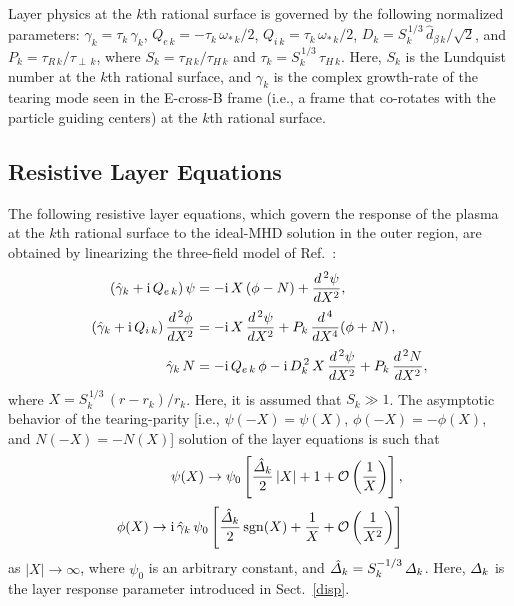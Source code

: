\documentclass[12pt,prb,aps]{revtex4-1}
\begin{document}
Layer physics at the $k$th rational surface is governed by the following normalized parameters:
$\hat{\gamma}_k= \tau_k\,\gamma_k$, 
$Q_{e\,k }= - \tau_k\,\omega_{\ast\,k}/2$, 
$Q_{i\,k }=  \tau_k\,\omega_{\ast\,k}/2$, 
$D_k = S_{k}^{\,1/3}\,\hat{d}_{\beta\,k}/\sqrt{2}$, 
and $P_{k} = \tau_{R\,k}/\tau_{\perp\,k}$, 
where $S_k = \tau_{R\,k}/\tau_{H\,k}$ and 
$\tau_k = S_k^{\,1/3} \,\tau_{H\,k}$.   Here, $S_k$ is the Lundquist number at the $k$th rational surface, and $\gamma_k$ is the complex growth-rate of the tearing mode seen in the E-cross-B frame (i.e., a frame that co-rotates with the
particle guiding centers) at the $k$th rational surface.

\subsection{Resistive Layer Equations}\label{rlayer}
The following resistive layer equations, which govern the response of the plasma at the $k$th rational surface to the ideal-MHD solution in the outer region,  are obtained by linearizing the three-field model of Ref.~:
\begin{align}\label{e80y}
(\hat{\gamma}_k+{\rm i}\,Q_{e\,k})\,\psi&= - {\rm i}\,X\left(\phi-N\right) + \frac{d^{\,2}\psi}{d X^2},\\[0.5ex]
(\hat{\gamma}_k+{\rm i}\,Q_{i\,k})\,\frac{d^{\,2}\phi}{d X^2}&= - {\rm i}\,X\,\frac{d^{\,2}\psi}{d X^2}+ P_{k}\,\frac{d^{\,4}}{d X^4}\!\left(\phi + N\right),\\[0.5ex]
\hat{\gamma}_k\,N&= - {\rm i}\,Q_{e\,k}\,\phi  - {\rm i} \,D_k^{\,2}\,X\,\frac{d^{\,2}\psi}{d X^{2}}
+ P_{k}\,\frac{d^{\,2} N}{d X^{2}},\label{e82y}
\end{align}
where $X=S_k^{\,1/3}\,(r-r_k)/r_k$. Here, it is assumed that $S_k\gg 1$.  The asymptotic behavior of the tearing-parity [i.e., $\psi(-X)=\psi(X)$, $\phi(-X)= -\phi(X)$, and $N(-X)=-N(X)$] solution of the layer
equations is such that
\begin{align}\label{e47y}
\psi(X)\rightarrow  \psi_0\left[\frac{\hat{\mit\Delta}_k}{2}\,|X| +1 + {\cal O}\left(\frac{1}{X}\right)\right],\\[0.5ex]
\phi(X)\rightarrow  {\rm i}\,\hat{\gamma}_k\,\psi_0\left[\frac{\hat{\mit\Delta}_k}{2}\,{\rm sgn}(X) +\frac{1}{X} + {\cal O}\left(\frac{1}{X^2}\right)\right]\label{e85y}
\end{align}
as $|X|\rightarrow\infty$, where $\psi_0$ is an arbitrary constant, and 
$\hat{\mit\Delta}_k = S_k^{-1/3}\,{\mit\Delta}_k$. Here, ${\mit\Delta}_k$ is the layer response parameter introduced in Sect.~\ref{disp}. 
\end{document}
